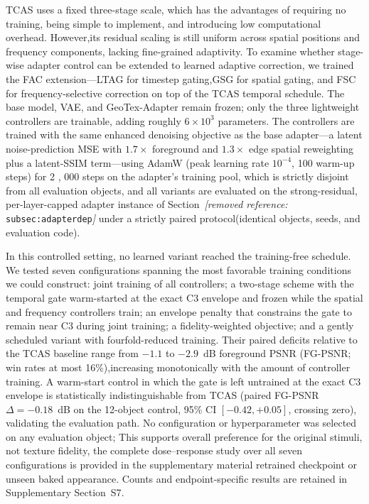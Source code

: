 \documentclass[times,twocolumn,final]{elsarticle}
\providecommand{\DIFadd}[1]{{\protect\color{blue} \sf #1}} %
\providecommand{\DIFdel}[1]{{\protect\color{red} \scriptsize #1}} %
\providecommand{\DIFaddbegin}{} %
\providecommand{\DIFaddend}{} %
\providecommand{\DIFdelbegin}{} %
\providecommand{\DIFdelend}{} %
\begin{document}
\DIFdel{TCAS uses a fixed three-stage scale, which has the advantages of requiring no training, being simple to implement, and introducing low computational overhead. However,its residual scaling is still uniform across spatial positions and frequency components, lacking fine-grained adaptivity. To examine whether stage-wise adapter control can be extended to learned adaptive correction, we trained the FAC extension---LTAG for timestep gating,GSG for spatial gating, and FSC for frequency-selective correction on top of the TCAS temporal schedule. The base model, VAE, and GeoTex-Adapter remain frozen; only the three lightweight controllers are trainable, adding roughly $6\times10^{3}$ parameters. The controllers are trained with the same enhanced denoising objective as the base adapter---a latent noise-prediction MSE with $1.7\times$ foreground and $1.3\times$ edge spatial reweighting plus a latent-SSIM term---using AdamW (peak learning rate $10^{-4}$, 100 warm-up steps) for 2}%
\DIFdel{,}%
\DIFdel{000 steps on the adapter's training pool, which is strictly disjoint from all evaluation objects, and all variants are evaluated on the strong-residual, per-layer-capped adapter instance of Section~\textit{[removed reference: }\texttt{subsec:adapterdep}\textit{]} under a strictly paired protocol(identical objects, seeds, and evaluation code). }%

\DIFdel{In this controlled setting, no learned variant reached the training-free schedule. We tested seven configurations spanning the most favorable training conditions we could construct: joint training of all controllers; a two-stage scheme with the temporal gate warm-started at the exact C3 envelope and frozen while the spatial and frequency controllers train; an envelope penalty that constrains the gate to remain near C3 during joint training; a fidelity-weighted objective; and a gently scheduled variant with fourfold-reduced training. Their paired deficits relative to the TCAS baseline range from $-1.1$ to $-2.9$~dB foreground PSNR (FG-PSNR; win rates at most 16\%),increasing monotonically with the amount of controller training. A warm-start control in which the gate is left untrained at the exact C3 envelope is statistically indistinguishable from TCAS (paired FG-PSNR $\Delta=-0.18$~dB on the 12-object control, 95\% CI $[-0.42,+0.05]$, crossing zero), validating the evaluation path. No configuration or hyperparameter was selected on any evaluation object; }\DIFdelend \DIFaddbegin \DIFadd{This supports overall preference for the original stimuli, not texture fidelity, }\DIFaddend the \DIFdelbegin \DIFdel{complete dose--response study over all seven configurations is provided in the supplementary material}\DIFdelend \DIFaddbegin \DIFadd{retrained checkpoint or unseen baked appearance. Counts and endpoint-specific results are retained in Supplementary Section~S7}\DIFaddend .
\end{document}
